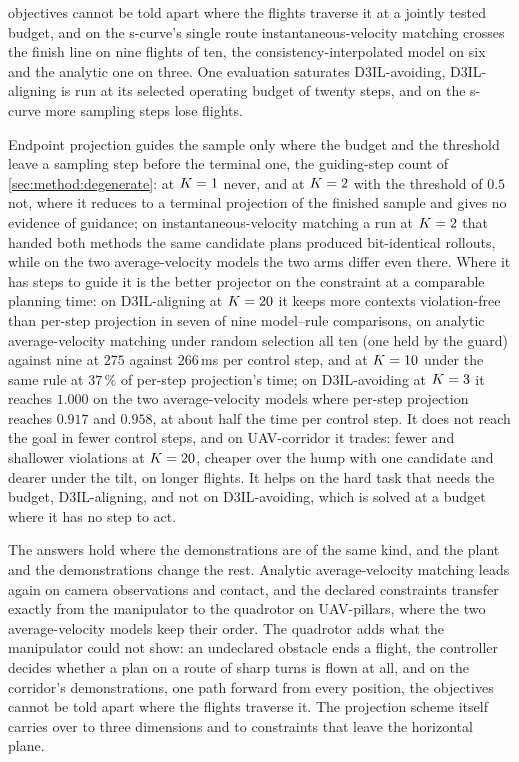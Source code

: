 \begin{description}
    objectives cannot be told apart where the flights traverse it at a jointly tested budget, and on
    the s-curve's single route instantaneous-velocity matching crosses the finish line on nine
    flights of ten, the consistency-interpolated model on six and the analytic one on three. One evaluation saturates D3IL-avoiding, D3IL-aligning is run at its
    selected operating budget of twenty steps, and on the s-curve more sampling steps lose flights.
  \item[RQ2 --- Constraints.] Endpoint projection guides the sample only where the budget and the
    threshold leave a sampling step before the terminal one, the guiding-step count of
    \autoref{sec:method:degenerate}: at $K = 1$ never, and at $K = 2$ with the threshold of
    $0.5$ not, where it reduces to a terminal projection of the finished sample and gives no evidence
    of guidance; on instantaneous-velocity matching a run at $K = 2$ that handed both methods the
    same candidate plans produced bit-identical rollouts, while on the two average-velocity models the
    two arms differ even there. Where it has steps to guide it is the better projector on the
    constraint at a comparable planning time: on D3IL-aligning at $K = 20$ it keeps more contexts
    violation-free than per-step projection in seven of nine model--rule comparisons, on analytic
    average-velocity matching under random selection all ten (one held by the guard) against nine at $275$ against
    $266$\,ms per control step, and at $K = 10$ under the same rule at $37\,\%$ of per-step
    projection's time; on D3IL-avoiding at $K = 3$ it reaches $1.000$ on the two average-velocity
    models where per-step projection reaches $0.917$ and $0.958$, at about half the time per control
    step. It does not reach the goal in fewer control steps, and on UAV-corridor it trades: fewer and
    shallower violations at $K = 20$, cheaper over the hump with one candidate and dearer under
    the tilt, on longer flights. It helps on the hard task that needs the budget, D3IL-aligning, and
    not on D3IL-avoiding, which is solved at a budget where it has no step to act.
  \item[RQ3 --- Transfer.] The answers hold where the demonstrations are of the same kind, and the
    plant and the demonstrations change the rest. Analytic average-velocity matching leads again on
    camera observations and contact, and the declared constraints transfer exactly from the
    manipulator to the quadrotor on UAV-pillars, where the two average-velocity models keep their
    order. The quadrotor adds what the manipulator could not show: an undeclared obstacle ends a
    flight, the controller decides whether a plan on a route of sharp turns is flown at all, and on
    the corridor's demonstrations, one path forward from every position, the objectives cannot be
    told apart where the flights traverse it. The projection scheme itself carries over to three
    dimensions and to constraints that leave
    the horizontal plane.
\end{description}
